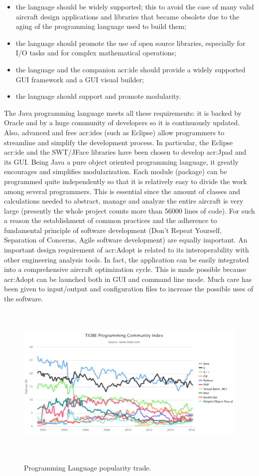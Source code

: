 \begin{itemize}
\item the language should be widely supported; this to avoid the case of many valid aircraft design applications and libraries that became obsolete due to the aging of the programming language used to build them;
\item the language should promote the use of open source libraries, especially for I/O tasks and for complex mathematical operations;
\item the language and the companion \gls{acr:ide} should provide a widely supported \gls{GUI} framework and a \gls{GUI} visual builder;
\item  the language should support and promote modularity.
\end{itemize}
The Java programming language meets all these requirements: it is backed by Oracle and by a huge community of developers so it is continuously updated. Also, advanced and free \gls{acr:ide}s (such as Eclipse) allow programmers to streamline and simplify the development process. In particular, the Eclipse \gls{acr:ide} and the SWT/JFace libraries have been chosen to develop \gls{acr:Jpad} and its \gls{GUI}.
Being Java a pure object oriented programming language, it greatly encourages and simplifies modularization. Each module (package) can be programmed quite independently so that it is relatively easy to divide the work among several programmers. This is essential since the amount of classes and calculations needed to abstract, manage and analyze the entire aircraft is very large (presently the whole project counts more than 56000 lines of code). For such a reason the establishment of common practices and the adherence to fundamental principle of software development (Don’t Repeat Yourself, Separation of Concerns, Agile software development) are equally important.
An important design requirement of \gls{acr:Adopt} is related to its interoperability with other engineering analysis tools. In fact, the application can be easily integrated into a comprehensive aircraft optimization cycle. This is made possible because \gls{acr:Adopt} can be launched both in \gls{GUI} and command line mode. Much care has been given to input/output and configuration files to increase the possible uses of the software.\cite{adoptunina}

\begin{figure}[H]
\centering
{\includegraphics[height=7.6cm ]{Immagini/trend.png}} 
\caption{Programming Language popularity trade.}
\label{fig:hl}
\end{figure}






